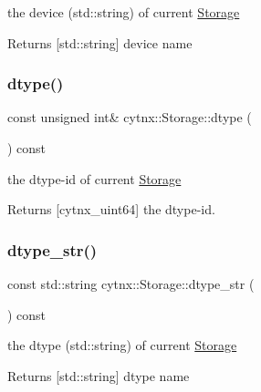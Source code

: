 the device (std\+::string) of current \hyperlink{classcytnx_1_1Storage}{Storage} 

\begin{DoxyReturn}{Returns}
\mbox{[}std\+::string\mbox{]} device name 
\end{DoxyReturn}
\mbox{\label{classcytnx_1_1Storage_a643824801e81ab86aca055f1dd1f34d7}} 
\subsubsection{\texorpdfstring{dtype()}{dtype()}}
{\footnotesize\ttfamily const unsigned int\& cytnx\+::\+Storage\+::dtype (\begin{DoxyParamCaption}{ }\end{DoxyParamCaption}) const\hspace{0.3cm}{\ttfamily [inline]}}



the dtype-\/id of current \hyperlink{classcytnx_1_1Storage}{Storage} 

\begin{DoxyReturn}{Returns}
\mbox{[}cytnx\+\_\+uint64\mbox{]} the dtype-\/id. 
\end{DoxyReturn}
\mbox{\label{classcytnx_1_1Storage_ab6e9fb01ad4655701a2d54dc978eef17}} 
\subsubsection{\texorpdfstring{dtype\+\_\+str()}{dtype\_str()}}
{\footnotesize\ttfamily const std\+::string cytnx\+::\+Storage\+::dtype\+\_\+str (\begin{DoxyParamCaption}{ }\end{DoxyParamCaption}) const\hspace{0.3cm}{\ttfamily [inline]}}



the dtype (std\+::string) of current \hyperlink{classcytnx_1_1Storage}{Storage} 

\begin{DoxyReturn}{Returns}
\mbox{[}std\+::string\mbox{]} dtype name 
\end{DoxyReturn}
\mbox{\label{classcytnx_1_1Storage_a48f0424f051a4b3a821eb964be4cd5db}} 
